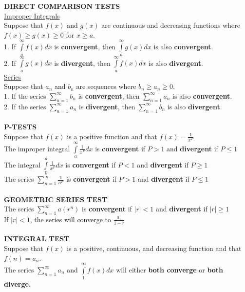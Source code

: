 \documentclass[10pt]{article}
\begin{document}
\noindent
\textbf{DIRECT COMPARISON TESTS}\\
\underline{Improper Integrals}\\
Suppose that $f(x)$ and $g(x)$ are continuous and decreasing functions where $f(x)\geq{g(x)}\geq{0}$ for $x\geq{a}$.\\
1. If $\int\limits_{a}^{\infty}f(x) dx$ is \textbf{convergent}, then $\int\limits_{a}^{\infty}g(x) dx$ is also \textbf{convergent}.\\
2. If $\int\limits_{a}^{\infty}g(x) dx$ is \textbf{divergent}, then $\int\limits_{a}^{\infty}f(x) dx$ is also \textbf{divergent}.
\\
\underline{Series}\\
Suppose that $a_n$ and $b_n$ are sequences where $b_n\geq{a_n}\geq{0}$.\\
1. If the series $\sum_{n=1}^{\infty}b_n$ is \textbf{convergent}, then $\sum_{n=1}^{\infty}a_n$ is also \textbf{convergent}.\\
2. If the series $\sum_{n=1}^{\infty}a_n$ is \textbf{divergent}, then $\sum_{n=1}^{\infty}b_n$ is also \textbf{divergent}.
\\\\
\textbf{P-TESTS}\\
Suppose that $f(x)$ is a positive function and that $f(x)=\frac{1}{x^P}$\\
The improper integral $\int\limits_{a}^{\infty}\frac{1}{x^P}dx$ is \textbf{convergent} if $P>1$ and \textbf{divergent} if $P\leq{1}$
The integral $\int\limits_{0}^{a}\frac{1}{x^P}dx$ is \textbf{convergent} if $P<1$ and \textbf{divergent} if $P\geq{1}$\\
The series $\sum_{n=1}^{\infty} \frac{1}{n^P}$ is \textbf{convergent} if $P>1$ and \textbf{divergent} if $P\leq{1}$
\\\\
\textbf{GEOMETRIC SERIES TEST}\\
The series $\sum_{n=1}^{\infty} a(r^n)$ is \textbf{convergent} if $|r|<{1}$ and \textbf{divergent} if $|r|\geq{1}$
\\If $|r|<{1}$, the series will converge to $\frac{a_1}{1-r}$
\\\\
\textbf{INTEGRAL TEST}\\
Suppose that $f(x)$ is a positive, continuous, and decreasing function and that $f(n)=a_n$.\\
The series $\sum_{n=1}^{\infty}a_n$ and $\int\limits_{1}^{\infty}f(x) dx$ will either \textbf{both converge} or \textbf{both diverge.} 
\\\\
\end{document}
